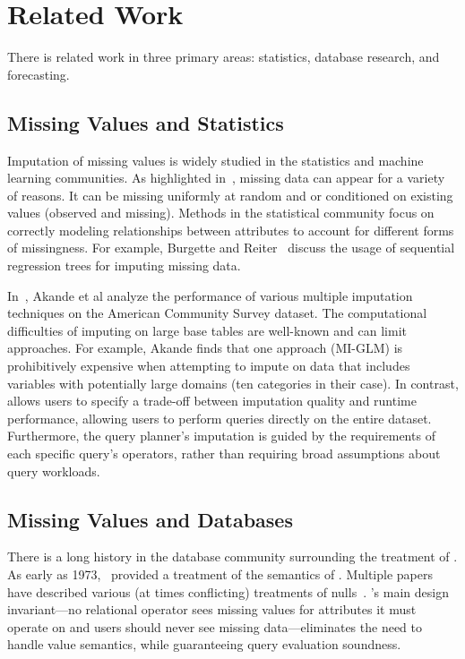 \section{Related Work}

There is related work in three primary areas: statistics, database research, and forecasting.

\subsection{Missing Values and Statistics}

Imputation of missing values is widely studied in the statistics and machine
learning communities. As highlighted in~\cite{gelman2006data}, missing data
can appear for a variety of reasons.
It can be missing uniformly at random and or conditioned on
existing values (observed and missing). Methods in the statistical community
focus on correctly modeling relationships between attributes to account for different forms of missingness. For example, Burgette and Reiter~\cite{burgette2010multiple} discuss the usage of sequential regression trees
for imputing missing data.

In~\cite{akande2015empirical}, Akande et al analyze the performance of various
multiple imputation techniques on the American Community Survey dataset. 
The computational difficulties of imputing on large base
tables are well-known and can limit approaches. For example, Akande finds that
one approach (MI-GLM) is prohibitively expensive when attempting to impute on data that
includes variables with potentially large domains (ten categories in their case).
In contrast, \ProjectName{} allows users to specify a trade-off between
imputation quality and runtime performance, allowing users to perform queries
directly on the entire dataset. Furthermore,
the query planner's imputation is guided by the requirements of each specific
query's operators, rather than requiring broad assumptions about query
workloads.  

\subsection{Missing Values and Databases}
There is a long history in the database community surrounding the
treatment of \nullv{}. As early as 1973,~\cite{codd1973understanding}
provided a treatment of the semantics of \nullv{}. Multiple
papers have described various (at times conflicting) treatments
of nulls~\cite{grant1977null}. \ProjectName's main design invariant---no relational operator
sees missing values for attributes it must operate on and users should never see
missing data---eliminates
the need to handle \nullv{} value semantics, while guaranteeing query evaluation soundness.

